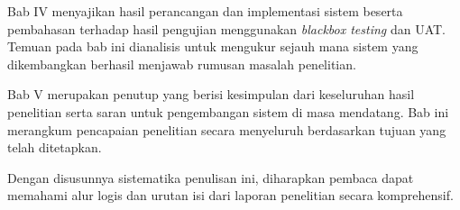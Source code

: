 Bab IV menyajikan hasil perancangan dan implementasi sistem beserta pembahasan terhadap hasil pengujian menggunakan \textit{blackbox testing} dan UAT. Temuan pada bab ini dianalisis untuk mengukur sejauh mana sistem yang dikembangkan berhasil menjawab rumusan masalah penelitian. \par

Bab V merupakan penutup yang berisi kesimpulan dari keseluruhan hasil penelitian serta saran untuk pengembangan sistem di masa mendatang. Bab ini merangkum pencapaian penelitian secara menyeluruh berdasarkan tujuan yang telah ditetapkan. \par

Dengan disusunnya sistematika penulisan ini, diharapkan pembaca dapat memahami alur logis dan urutan isi dari laporan penelitian secara komprehensif. \par

